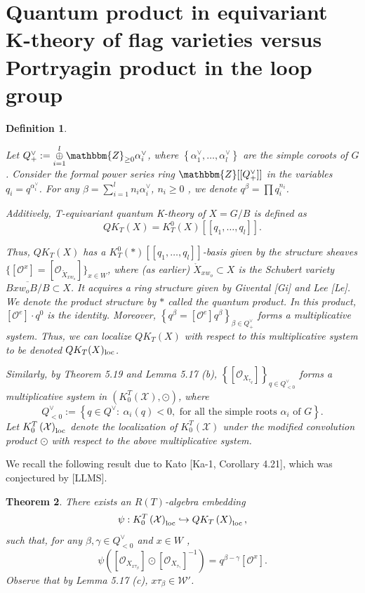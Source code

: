 \documentclass{article}
\newtheorem{theorem}{Theorem}[section]
\newtheorem{definition}[theorem]{Definition}
\def\X{\mathcal{X}}
\def\W{\mathcal{W}}
\def\ref#1{#1}
\def\loc{\rm{loc}}
\begin{document}
\section{Quantum product in equivariant K-theory of flag varieties versus Portryagin product in the loop group}

\begin{definition} \label{7.1}\rm{
Let $Q_+^\vee:= \underset{i=1}{\overset{l}{\oplus}} \mathbbm{Z}_{\geq0}\alpha_i^\vee$, where $\left\{\alpha_1^\vee,\ldots,\alpha_l^\vee\right\}$ are the simple coroots of $G$. Consider the formal power series ring $\mathbbm{Z} [[Q_+^\vee]]$ in the variables $q_i=q^{\alpha_i^\vee}$. For any $\beta=\sum_{i=1}^ln_i\alpha_i^\vee$, $n_i\geq 0$ , we denote $q^\beta=
\prod q_i^{n_i}$. 


Additively, \textit{T-equivariant quantum K-theory} of $X=G/B$ is defined as 
$$
Q K_T \left(X\right) = K_T^0 \left(X\right) [[ q_1, \ldots , q_l]].
$$

Thus, $QK_T(X)$ has a $K_T^0(*) [[q_1,\ldots,q_l]] $-basis given by the structure sheaves
$\{ \left[ \mathcal{O}^x\right] = [ \mathcal{O}_{\mathring{X}_{xw_o}}]\}_{x\in W}$, where (as earlier)
$\mathring{X}_{xw_o} \subset X$ is the Schubert variety $\overline{Bxw_oB/B}\subset X$.  
It acquires a ring structure given by Givental [Gi] and Lee [Le]. We denote the product structure by $*$ called the \textit{quantum product}. In this product,  $\left[\mathcal{O}^e\right]\cdot q^0
$ is the identity. Moreover, $\left\{ q^\beta= [\mathcal{O}^e]q^\beta \right\}_{\beta\in Q_+^\vee}
$ forms a multiplicative system. Thus, we can localize $QK_T(X)$ with respect to this multiplicative system to be denoted $QK_T(X)_{\loc}$.


Similarly, by Theorem \ref{5.19} and Lemma \ref{5.17} (b), 
$\left\{ \left[ \mathcal{O}_{X_{\tau_q}}\right]\right\}_{q\in Q_{<0}^\vee}$ forms a multiplicative system in $\left( K_0^T \left(\X\right),\odot \right)$, where 
$$Q_{<0}^\vee := \left\{ q\in Q^\vee:~ \alpha_i (q) <0, \mbox{ for all the simple roots $\alpha_i$ of $G$}\right\} .$$
 Let $K_0^T \left(\X\right)_{\loc}$ denote the localization of $K_0^T \left(\X\right)$ under the modified convolution product $\odot$ with respect to the above multiplicative system. }
\end{definition}

 We recall the following result due to Kato [Ka-1, Corollary 4.21], which was conjectured by [LLMS]. 

\begin{theorem} \label{7.2}There exists an $R(T)$-algebra embedding 
$$
 \psi:  K_0^T \left(\mathcal{X}\right)_{\loc} \hookrightarrow Q  K_T \left(X\right)_{\loc},
$$
such that, for any $\beta,\gamma \in Q_{<0}^\vee$ and $x\in W$ ,
$$
\psi \left( [\mathcal{O}_{X_{x\tau_\beta}}] \odot [ \mathcal{O}_{X_{\tau_\gamma}}]^{-1} \right) = q^{\beta-\gamma}[\mathcal{O}^x]. 
$$
Observe that by Lemma \ref{5.17} (c), $x\tau_{\beta}\in \W'$.
\end{theorem} 
\end{document}
